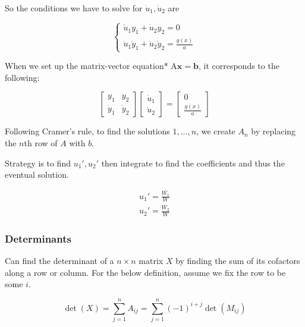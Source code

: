 So the conditions we have to solve for $\dot u_1,\dot u_2$ are

\begin{equation*}
    \begin{cases}
        \dot u_1y_1+\dot u_2y_2=0\\
        \dot u_1\dot y_1 + \dot u_2\dot y_2=\frac{g(x)}{a}
    \end{cases}
\end{equation*}

When we set up the matrix-vector equation* $\mathrm{A}\mathbf{x}=\mathbf{b}$, it corresponds to the following:

\begin{equation*}
    \begin{bmatrix}
        y_1 & y_2\\
        \dot y_1 & \dot y_2
    \end{bmatrix}
    \begin{bmatrix}
        \dot u_1\\\dot u_2
    \end{bmatrix}
    =\begin{bmatrix}
        0\\\frac{g(x)}{a}
    \end{bmatrix}
\end{equation*}

Following Cramer's rule, to find the solutions $1,\ldots,n$, we create $A_n$ by replacing the $n$th row of $A$ with $b$.

Strategy is to find $u_1', u_2'$ then integrate to find the coefficients and thus the eventual solution.

\begin{eqnarray}
    u_1'=\frac{W_1}{W}\\
    u_2'=\frac{W_2}{W}
\end{eqnarray}

\subsubsection{Determinants}

Can find the determinant of a $n\times n$ matrix $X$ by finding the sum of its cofactors along a row or column. For the below definition,
assume we fix the row to be some $i$.

\begin{equation*}
    \det (X)=\sum_{j=1}^n A_{ij}=\sum_{j=1}^n (-1)^{i+j}\det (M_{ij})
\end{equation*}

